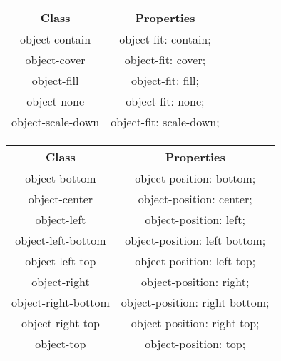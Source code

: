 \documentclass{report}
\begin{document}
    \pagebreak 
    \bigbreak \noindent 
    \begin{center}
        \begin{tabular}{c|c}
            Class &Properties \\
            \hline
            object-contain	&object-fit: contain;\\
            object-cover	&object-fit: cover;\\
            object-fill	&object-fit: fill;\\
            object-none	&object-fit: none;\\
            object-scale-down	&object-fit: scale-down;
        \end{tabular}
    \end{center}


    \pagebreak 
    \begin{center}
        \begin{tabular}{c|c}
            Class &Properties\\
            \hline
            object-bottom	&object-position: bottom;\\
            object-center	&object-position: center;\\
            object-left	&object-position: left;\\
            object-left-bottom	&object-position: left bottom;\\
            object-left-top	&object-position: left top;\\
            object-right	&object-position: right;\\
            object-right-bottom	&object-position: right bottom;\\
            object-right-top	&object-position: right top;\\
            object-top	&object-position: top;
        \end{tabular}
    \end{center}
\end{document}
